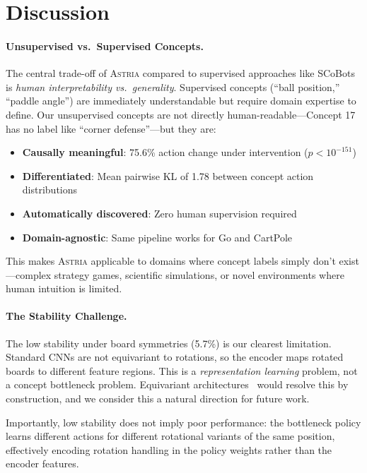 \documentclass[11pt,a4paper]{article}
\newcommand{\astria}{\textsc{Astria}}
\begin{document}
\section{Discussion}

\paragraph{Unsupervised vs.\ Supervised Concepts.}
The central trade-off of \astria{} compared to supervised approaches like SCoBots~\citep{delfosse2024interpretable} is \emph{human interpretability vs.\ generality}. Supervised concepts (``ball position,'' ``paddle angle'') are immediately understandable but require domain expertise to define. Our unsupervised concepts are not directly human-readable---Concept 17 has no label like ``corner defense''---but they are:
\begin{itemize}[leftmargin=*]
    \item \textbf{Causally meaningful}: 75.6\% action change under intervention ($p < 10^{-151}$)
    \item \textbf{Differentiated}: Mean pairwise KL of 1.78 between concept action distributions
    \item \textbf{Automatically discovered}: Zero human supervision required
    \item \textbf{Domain-agnostic}: Same pipeline works for Go and CartPole
\end{itemize}

This makes \astria{} applicable to domains where concept labels simply don't exist---complex strategy games, scientific simulations, or novel environments where human intuition is limited.

\paragraph{The Stability Challenge.}
The low stability under board symmetries (5.7\%) is our clearest limitation. Standard CNNs are not equivariant to rotations, so the encoder maps rotated boards to different feature regions. This is a \emph{representation learning} problem, not a concept bottleneck problem. Equivariant architectures~\citep{cohen2016group} would resolve this by construction, and we consider this a natural direction for future work.

Importantly, low stability does not imply poor performance: the bottleneck policy learns different actions for different rotational variants of the same position, effectively encoding rotation handling in the policy weights rather than the encoder features.
\end{document}
